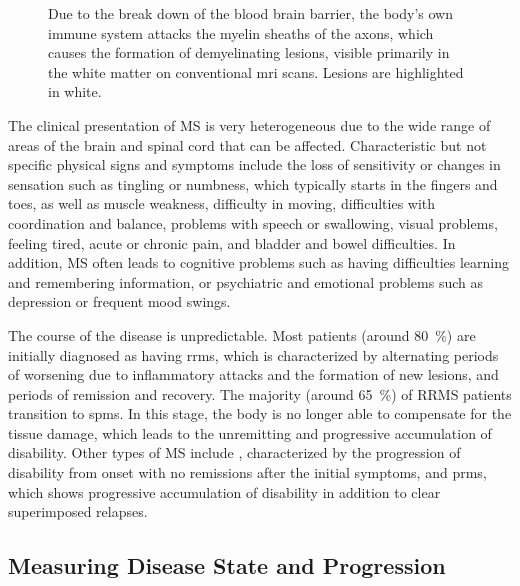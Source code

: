 \begin{figure}[tb]

\caption[Demyelination in MS]{Due to the break down of the blood brain barrier,
the body's own immune system attacks the myelin sheaths of the axons, which
causes the formation of demyelinating lesions, visible primarily in the white
matter on conventional \gls{mri} scans. Lesions are highlighted in white.}
\label{fig:ms}
\end{figure}
 
The clinical presentation of MS is very heterogeneous due to the wide range of
areas of the brain and spinal cord that can be affected. Characteristic but not
specific physical signs and symptoms include the loss of sensitivity or changes
in sensation such as tingling or numbness, which typically starts in the fingers
and toes, as well as muscle weakness, difficulty in moving, difficulties with
coordination and balance, problems with speech or swallowing, visual problems,
feeling tired, acute or chronic pain, and bladder and bowel difficulties. In
addition, MS often leads to cognitive problems such as having difficulties
learning and remembering information, or psychiatric and emotional problems such
as depression or frequent mood swings.

The course of the disease is unpredictable. Most patients (around
\SI{80}{\percent}) are initially diagnosed as having \gls{rrms}, which is
characterized by alternating periods of worsening due to inflammatory attacks
and the formation of new lesions, and periods of remission and recovery. The
majority (around \SI{65}{\percent}) of RRMS patients transition to \gls{spms}.
In this stage, the body is no longer able to compensate for the tissue damage,
which leads to the unremitting and progressive accumulation of disability. Other
types of MS include ,
characterized by the progression of disability from onset with no remissions
after the initial symptoms, and \gls{prms}, which shows progressive accumulation
of disability in addition to clear superimposed relapses.


\subsection[Measuring disease state and progression]{Measuring Disease State and
Progression}

